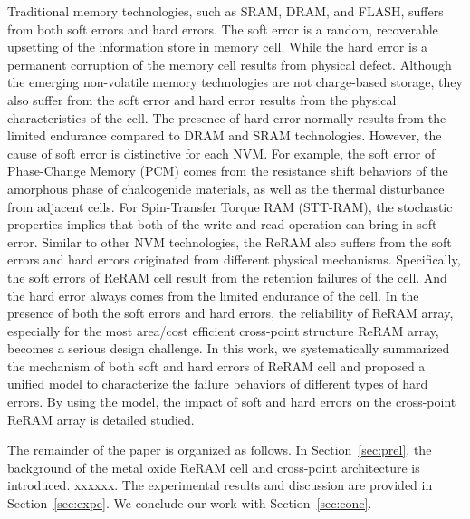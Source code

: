 Traditional memory technologies, such as SRAM, DRAM, and FLASH, suffers from both soft errors and hard errors. The soft error is a random, recoverable upsetting of the information store in memory cell. While the hard error is a permanent corruption of the memory cell results from physical defect. Although the emerging non-volatile memory technologies are not charge-based storage, they also suffer from the soft error and hard error results from the physical characteristics of the cell. The presence of hard error normally results from the limited endurance compared to DRAM and SRAM technologies. However, the cause of soft error is distinctive for each NVM. For example, the soft error of Phase-Change Memory (PCM) comes from the resistance shift behaviors of the amorphous phase of chalcogenide materials, as well as the thermal disturbance from adjacent cells. For Spin-Transfer Torque RAM (STT-RAM), the stochastic properties implies that both of the write and read operation can bring in soft error. Similar to other NVM technologies, the ReRAM also suffers from the soft errors and hard errors originated from different physical mechanisms. Specifically, the soft errors of ReRAM cell result from the retention failures of the cell. And the hard error always comes from the limited endurance of the cell. In the presence of both the soft errors and hard errors, the reliability of ReRAM array, especially for the most area/cost efficient cross-point structure ReRAM array, becomes a serious design challenge. In this work, we systematically summarized the mechanism of both soft and hard errors of ReRAM cell and proposed a unified model to characterize the failure behaviors of different types of hard errors. By using the model, the impact of soft and hard errors on the cross-point ReRAM array is detailed studied.



The remainder of the paper is organized as follows. In Section~\ref{sec:prel}, the background of the metal oxide ReRAM cell and cross-point architecture is introduced. xxxxxx. The experimental results and discussion are provided in Section~\ref{sec:expe}. We conclude our work with Section~\ref{sec:conc}. 